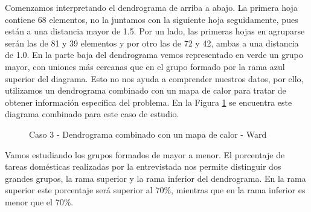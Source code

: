 \documentclass[a4paper, 20pt]{article}
\begin{document}
Comenzamos interpretando el dendrograma de arriba a abajo. La primera hoja contiene 68 elementos, no la juntamos con la siguiente hoja seguidamente, pues están a una distancia mayor de 1.5. Por un lado, las primeras hojas en agruparse serán las de 81 y 39 elementos y por otro las de 72 y 42, ambas a una distancia de 1.0. En la parte baja del dendrograma vemos representado en verde un grupo mayor, con uniones más cercanas que en el grupo formado por la rama azul superior del diagrama. Esto no nos ayuda a comprender nuestros datos, por ello, utilizamos un dendrograma combinado con un mapa de calor para tratar de obtener información específica del problema. En la Figura \ref{fig:dendro_heat3} se encuentra este diagrama combinado para este caso de estudio.

\begin{figure}[H]
    \centering
    \caption{Caso 3 - Dendrograma combinado con un mapa de calor - Ward}
    \label{fig:dendro_heat3}
\end{figure}

Vamos estudiando los grupos formados de mayor a menor. El porcentaje de tareas domésticas realizadas por la entrevistada nos permite distinguir dos grandes grupos, la rama superior y la rama inferior del dendrograma. En la rama superior este porcentaje será superior al 70\%, mientras que en la rama inferior es menor que el 70\%.
\end{document}
